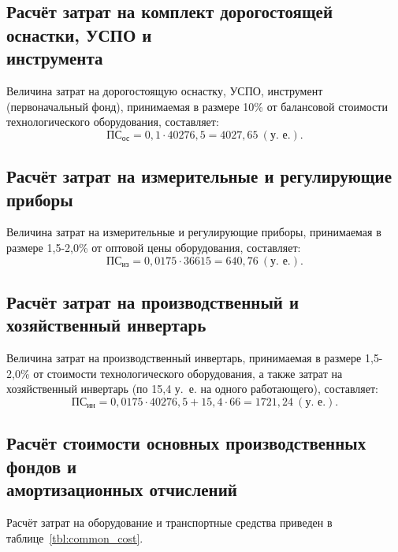 \subsection{%
  Расчёт затрат на комплект дорогостоящей оснастки, УСПО и \\
  инструмента
}

Величина затрат на дорогостоящую оснастку, УСПО, 
инструмент (первоначальный фонд), принимаемая в размере 10\% от 
балансовой стоимости технологического оборудования, составляет:
\begin{equation*}
  \text{ПС}_{\text{ос}} = 0{,}1 \cdot 40276{,}5 = 4027{,}65 \: (\text{у.~е.}).
\end{equation*}

\subsection{Расчёт затрат на измерительные и
  регулирующие приборы}

Величина затрат на измерительные и регулирующие приборы,
принимаемая в размере 1{,}5-2{,}0\% от 
оптовой цены оборудования, составляет:
\begin{equation*}
  \text{ПС}_{\text{из}} = 0{,}0175 \cdot 36615 = 640{,}76 \: (\text{у.~е.}).
\end{equation*}

\subsection{Расчёт затрат на производственный и
  хозяйственный инвертарь}

Величина затрат на производственный инвертарь,
принимаемая в размере 1{,}5-2{,}0\% от 
стоимости технологического оборудования, а также 
затрат на хозяйственный инвертарь 
(по 15{,}4 у.~е. на одного работающего), составляет:
\begin{equation*}
  \text{ПС}_{\text{ин}} = 
  0{,}0175 \cdot 40276{,}5 + 15{,}4 \cdot 66 = 1721{,}24 \: (\text{у.~е.}).
\end{equation*}

\subsection{Расчёт стоимости основных производственных фондов и \\
амортизационных отчислений}

Расчёт затрат на оборудование и транспортные средства
приведен в таблице~\ref{tbl:common_cost}.

